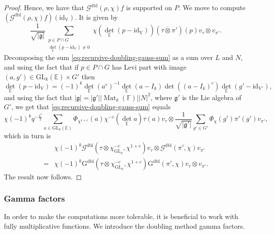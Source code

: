 \documentclass[12pt, reqno]{amsart}
\theoremstyle{definition}
\theoremstyle{definition}
\theoremstyle{definition}
\newcommand{\detQuadratic}{{\det}_{\quadraticExtension}}
\newcommand{\idmap}{\mathrm{id}}
\newcommand{\sizeof}[1]{\left|#1\right|}
\newcommand{\hermitianSpace}{\mathrm{V}}
\newcommand{\involution}[1]{#1^{c}}
\newcommand{\minusInvolution}[1]{#1^{-c}}
\newcommand{\involutionPlusOne}[1]{#1^{1+c}}
\newcommand{\IdentityMatrix}[1]{I_{#1}}
\newcommand{\GL}{\mathrm{GL}}
\newcommand{\finiteField}{\mathbb{F}}
\newcommand{\quadraticExtension}{\mathbb{E}}
\newcommand{\squareMatrix}{\operatorname{Mat}}
\newcommand{\dblGaussSum}[2]{\mathcal{G}^{\mathrm{dbl}}\left(#1, #2\right)}
\newcommand{\dblGaussSumScalar}[2]{\mathrm{G}^{\mathrm{dbl}}\left(#1, #2\right)}
\newcommand{\lieAlgebra}{\mathfrak{g}}
\begin{document}
\begin{proof}
	Hence, we have that $\dblGaussSum{\rho}{\chi} f$ is supported on $P$. We move to compute $\left(\dblGaussSum{\rho}{\chi} f\right)\left(\idmap_{\hermitianSpace}\right)$. It is given by
	\begin{equation}\label{eq:recursive-doubling-gauss-sum}
		\frac{1}{\sqrt{\sizeof{\lieAlgebra}}} \sum_{\substack{p \in P \cap G\\
				\detQuadratic\left(p - \idmap_{\hermitianSpace}\right) \ne 0}} \chi\left(\detQuadratic\left(p - \idmap_{\hermitianSpace}\right)\right) \left(\tau \overline{\otimes} \pi'\right)\left(p\right) v_{\tau} \otimes v_{\pi'}.
	\end{equation}
	Decomposing the sum \eqref{eq:recursive-doubling-gauss-sum} as a sum over $L$ and $N$, and using the fact that if $p \in P \cap G$ has Levi part with image $\left(a, g'\right) \in \GL_k\left(\quadraticExtension\right) \times G'$ then $$\detQuadratic\left(p - \idmap_{\hermitianSpace}\right) = \left(-1\right)^k \detQuadratic\left(\involution{a}\right)^{-1}\detQuadratic\left(a - \IdentityMatrix{k}\right) \det\left(\involution{\left(a - \IdentityMatrix{k}\right)}\right) \detQuadratic\left( g' - \idmap_{\hermitianSpace'}\right),$$
	and using the fact that $\sizeof{\lieAlgebra} = \sizeof{\lieAlgebra'} \sizeof{\squareMatrix_k\left(\finiteField\right)} \sizeof{N}^2$, where $\lieAlgebra'$ is the Lie algebra of $G'$,
	we get that \eqref{eq:recursive-doubling-gauss-sum} equals
	\begin{equation}
		\chi\left(-1\right)^k q^{-\frac{k^2}{2}} \sum_{a \in \GL_k\left(\quadraticExtension\right)} \Phi_{\involutionPlusOne{\chi}}\left(a\right) \minusInvolution{\chi}\left(\detQuadratic a\right) \tau\left(a\right) v_{\tau} \otimes \frac{1}{\sqrt{\sizeof{\lieAlgebra'}}} \sum_{g' \in G'} \Phi_{\chi}\left(g'\right) \pi'\left(g'\right) v_{\pi'},
	\end{equation}
	which in turn is
	\begin{align*}
		&\chi\left(-1\right)^k \dblGaussSum{\tau \otimes \minusInvolution{\chi_{\GL_k}}}{\involutionPlusOne{\chi}} v_{\tau} \otimes \dblGaussSum{\pi'}{\chi} v_{\pi'}\\
		=& \chi\left(-1\right)^k\dblGaussSumScalar{\tau \otimes \minusInvolution{\chi_{\GL_k}}}{\involutionPlusOne{\chi}} \dblGaussSumScalar{\pi'}{\chi} v_{\tau} \otimes v_{\pi'}.
	\end{align*}
	The result now follows.
\end{proof}

\subsubsection{Gamma factors}
In order to make the computations more tolerable, it is beneficial to work with fully multiplicative functions. We introduce the doubling method gamma factors.
\end{document}
